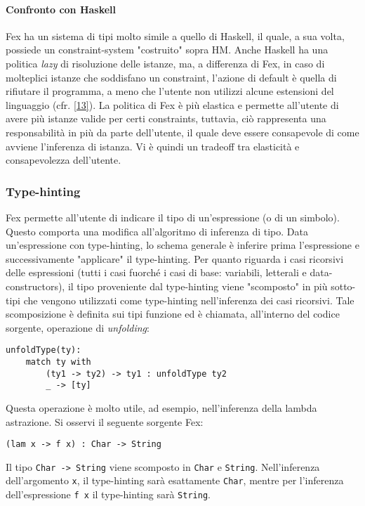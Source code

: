 \documentclass[10pt,a4paper]{article}
\begin{document}
\hypertarget{Confronto con Haskell}{\paragraph{Confronto con Haskell}}
Fex ha un sistema di tipi molto simile a quello di Haskell, il quale, a sua volta, possiede un constraint-system
"costruito" sopra HM. Anche Haskell ha una politica \textit{lazy} di risoluzione delle istanze, ma, a differenza di Fex,
in caso di molteplici istanze che soddisfano un constraint, l'azione di default è quella di rifiutare il programma,
a meno che l'utente non utilizzi alcune estensioni del linguaggio (cfr. \hyperlink{bibl13}{[13]}).
La politica di Fex è più elastica e permette all'utente
di avere più istanze valide per certi constraints, tuttavia, ciò rappresenta una responsabilità in più da parte
dell'utente, il quale deve essere consapevole di come avviene l'inferenza di istanza. Vi è quindi un tradeoff tra
elasticità e consapevolezza dell'utente.

\hypertarget{Type-hinting}{\subsubsection{Type-hinting}}
Fex permette all'utente di indicare il tipo di un'espressione (o di un simbolo). Questo comporta una modifica
all'algoritmo di inferenza di tipo. Data un'espressione con type-hinting, lo schema generale è inferire prima
l'espressione e successivamente "applicare" il type-hinting. Per quanto riguarda i casi ricorsivi delle espressioni
(tutti i casi fuorché i casi di base: variabili, letterali e data-constructors), il tipo proveniente dal type-hinting
viene "scomposto" in più sotto-tipi che vengono utilizzati come type-hinting nell'inferenza dei casi ricorsivi. Tale
scomposizione è definita sui tipi funzione ed è chiamata, all'interno del codice sorgente, operazione di
\textit{unfolding}:
\begin{lstlisting}
unfoldType(ty):
    match ty with
        (ty1 -> ty2) -> ty1 : unfoldType ty2
        _ -> [ty]
\end{lstlisting}
Questa operazione è molto utile, ad esempio, nell'inferenza della lambda astrazione. Si osservi il seguente sorgente
Fex:
\begin{lstlisting}
(lam x -> f x) : Char -> String
\end{lstlisting}
Il tipo \texttt{Char -> String} viene scomposto in \texttt{Char} e \texttt{String}. Nell'inferenza dell'argomento
\texttt{x}, il type-hinting sarà esattamente \texttt{Char}, mentre per l'inferenza dell'espressione \texttt{f x}
il type-hinting sarà \texttt{String}.
\end{document}
